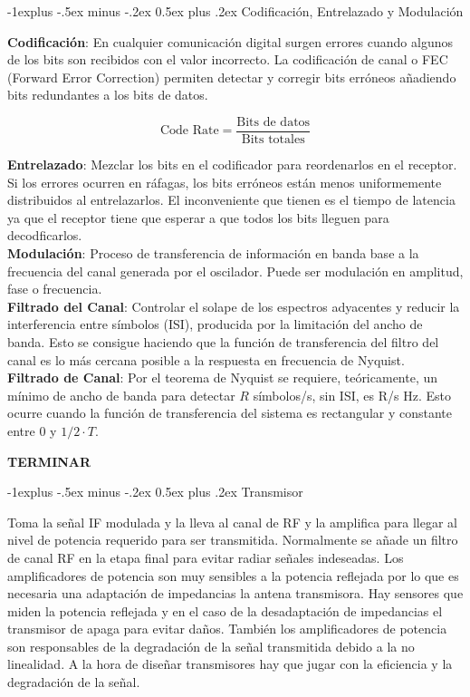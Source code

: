 \documentclass[10pt,portrait, twocolumn]{article}
\makeatletter
\renewcommand{\subsection}{\@startsection{subsection}{2}{0mm}%
                                {-1explus -.5ex minus -.2ex}%
                                {0.5ex plus .2ex}%
                                {\normalfont\normalsize\bfseries}}
\makeatother
\begin{document}
\subsection{Codificación, Entrelazado y Modulación}

\textbf{Codificación}: En cualquier comunicación digital surgen errores cuando algunos de los bits son recibidos con el valor incorrecto. La codificación de canal o FEC (Forward Error Correction) permiten detectar y corregir bits erróneos añadiendo bits redundantes a los bits de datos.

	\begin{equation*}
		\text{Code Rate} = \frac{\text{Bits de datos}}{\text{Bits totales}}
	\end{equation*}

\textbf{Entrelazado}:  Mezclar los bits en el codificador para reordenarlos en el receptor. Si los errores ocurren en ráfagas, los bits erróneos están menos uniformemente distribuidos al entrelazarlos. El inconveniente que tienen es el tiempo de latencia ya que el receptor tiene que esperar a que todos los bits lleguen para decodficarlos.\\

\textbf{Modulación}: Proceso de transferencia de información en banda base a la frecuencia del canal generada por el oscilador. Puede ser modulación en amplitud, fase o frecuencia.\\

\textbf{Filtrado del Canal}: Controlar el solape de los espectros adyacentes y reducir la interferencia entre símbolos (ISI), producida por la limitación del ancho de banda. Esto se consigue haciendo que la función de transferencia del filtro del canal es lo más cercana posible a la respuesta en frecuencia de Nyquist.\\

\textbf{Filtrado de Canal}: Por el teorema de Nyquist se requiere, teóricamente, un mínimo de ancho de banda para detectar $R$ símbolos/s, sin ISI, es R/s Hz. Esto ocurre cuando la función de transferencia del sistema es rectangular y constante entre 0 y $1/2 \cdot T$.

\textbf{TERMINAR}

\subsection{Transmisor}

Toma la señal IF modulada y la lleva al canal de RF y la amplifica para llegar al nivel de potencia requerido para ser transmitida. Normalmente se añade un filtro de canal RF en la etapa final para evitar radiar señales indeseadas. Los amplificadores de potencia son muy sensibles a la potencia reflejada por lo que es necesaria una adaptación de impedancias la antena transmisora. Hay sensores que miden la potencia reflejada y en el caso de la desadaptación de impedancias el transmisor de apaga para evitar daños. También los amplificadores de potencia son responsables de la degradación de la señal transmitida debido a la no linealidad. A la hora de diseñar transmisores hay que jugar con la eficiencia y la degradación de la señal.
\end{document}
